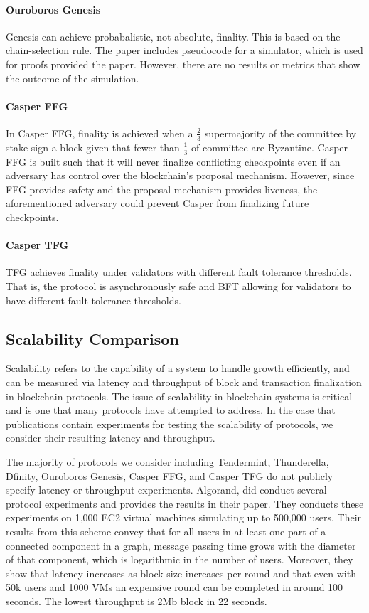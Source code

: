\documentclass[10pt,journal,compsoc]{IEEEtran}
\begin{document}
\paragraph{Ouroboros Genesis} Genesis can achieve probabalistic, not absolute, finality. This is based on the chain-selection rule. The paper includes pseudocode for a simulator, which is used for proofs provided the paper. However, there are no results or metrics that show the outcome of the simulation. 

\paragraph{Casper FFG} In Casper FFG, finality is achieved when a \(\frac{2}{3}\) supermajority of the committee by stake sign a block given that fewer than \(\frac{1}{3}\) of committee are Byzantine. Casper FFG is built such that it will never finalize conflicting checkpoints even if an adversary has control over the blockchain's proposal mechanism. However, since FFG provides safety and the proposal mechanism provides liveness, the aforementioned adversary could prevent Casper from finalizing future checkpoints.

\paragraph{Casper TFG} TFG achieves finality under validators with different fault tolerance thresholds. That is, the protocol is asynchronously safe and BFT allowing for validators to have different fault tolerance thresholds.

\subsection{Scalability Comparison}
Scalability refers to the capability of a system to handle growth efficiently, and can be measured via latency and throughput of block and transaction finalization in blockchain protocols. The issue of scalability in blockchain systems is critical and is one that many protocols have attempted to address. In the case that publications contain experiments for testing the scalability of protocols, we consider their resulting latency and throughput. 

The majority of protocols we consider including Tendermint, Thunderella, Dfinity, Ouroboros Genesis, Casper FFG, and Casper TFG do not publicly specify latency or throughput experiments. Algorand, did conduct several protocol experiments and provides the results in their paper. They conducts these experiments on 1,000 EC2 virtual machines simulating up to 500,000 users. Their results from this scheme convey that for all users in at least one part of a connected component in a graph, message passing time grows with the diameter of that component, which is logarithmic in the number of users. Moreover, they show that latency increases as block size increases per round and that even with 50k users and 1000 VMs an expensive round can be completed in around 100 seconds. The lowest throughput is 2Mb block in 22 seconds.	
 
\end{document}
